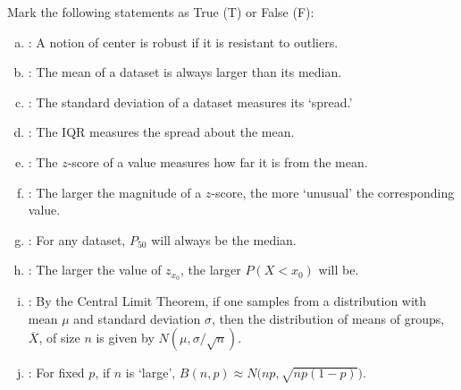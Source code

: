 \documentclass[12pt,letterpaper]{exam}
\begin{document}
\examtitle
{} 
\scores
\newpage

\begin{questions}

\newpage
\question[10] Mark the following statements as True (T) or False (F): \pspace
\begin{enumerate}[(a)]
\item \underline{\hspace{1.5cm}}: A notion of center is robust if it is resistant to outliers. \vfill
\item \underline{\hspace{1.5cm}}: The mean of a dataset is always larger than its median. \vfill
\item \underline{\hspace{1.5cm}}: The standard deviation of a dataset measures its `spread.' \vfill
\item \underline{\hspace{1.5cm}}: The IQR measures the spread about the mean. \vfill
\item \underline{\hspace{1.5cm}}: The $z$-score of a value measures how far it is from the mean. \vfill
\item \underline{\hspace{1.5cm}}: The larger the magnitude of a $z$-score, the more `unusual' the corresponding value. \vfill
\item \underline{\hspace{1.5cm}}: For any dataset, $P_{50}$ will always be the median. \vfill
\item \underline{\hspace{1.5cm}}: The larger the value of $z_{x_0}$, the larger $P(X < x_0)$ will be. \vfill
\item \underline{\hspace{1.5cm}}: By the Central Limit Theorem, if one samples from a distribution with mean $\mu$ and standard deviation $\sigma$, then the distribution of means of groups, $\overline{X}$, of size $n$ is given by $N(\mu, \sigma/\sqrt{n})$. \vfill
\item \underline{\hspace{1.5cm}}: For fixed $p$, if $n$ is `large', $B(n, p) \approx N\big(np, \sqrt{np(1 - p)} \big)$. \vfill
\end{enumerate}




\end{questions}
\end{document}
